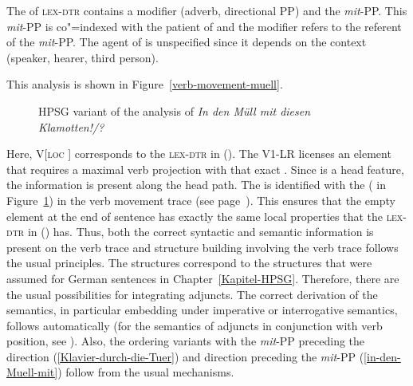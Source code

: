 \begin{exe}
\begin{xlist}[iv.]
\begin{exe}
\begin{xlist}[iv.]
The \subcatl of \textsc{lex-dtr} contains a modifier (adverb, directional PP) and the 
\emph{mit}-PP. This \emph{mit}-PP is co"=indexed with the patient of  and the modifier refers to the referent of the \emph{mit}-PP. The agent
of  is unspecified since it depends on the context (speaker, hearer, third person).

This analysis is shown in Figure~\vref{verb-movement-muell}.
\begin{figure}
\caption{\label{verb-movement-muell}HPSG variant of the analysis of \emph{In den Müll mit diesen Klamotten!/?}}
\end{figure}%
Here, V[\textsc{loc} ] corresponds to the \textsc{lex-dtr} in (). The V1-LR licenses an element that requires a maximal verb projection
with that exact \dslv {}. Since \dsl is a head feature, the information is present along the head path. The \dslv is identified with the \localv
( in Figure~\ref{verb-movement-muell}) in the verb movement trace (see page~\pageref{le-verbspur}). 
This ensures that the empty element at the end of sentence has exactly the same local properties that the \textsc{lex-dtr} in () has.
Thus, both the correct syntactic and semantic information is present on the verb trace and structure
building involving the verb trace follows the usual principles.
The structures correspond to the structures that were assumed for German sentences in Chapter~\ref{Kapitel-HPSG}.
Therefore, there are the usual possibilities for integrating adjuncts. The correct derivation of the semantics, in particular embedding under
imperative or interrogative semantics, follows automatically (for the semantics of adjuncts in conjunction with verb position, see  ). 
Also, the ordering variants with the \emph{mit}-PP preceding the direction (\ref{Klavier-durch-die-Tuer}) and direction preceding the 
\emph{mit}-PP (\ref{in-den-Muell-mit}) follow from the usual mechanisms.


\end{xlist}
\end{exe}
\end{xlist}
\end{exe}
